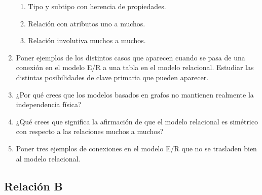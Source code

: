 \begin{enumerate}
\begin{enumerate}
        \item Tipo y subtipo con herencia de propiedades.
        \item Relación con atributos uno a muchos.
        \item Relación involutiva muchos a muchos.
    \end{enumerate}
    \item Poner ejemplos de los distintos casos que aparecen cuando se pasa de una conexión en el modelo E/R a una tabla en el modelo relacional. Estudiar las distintas posibilidades de clave primaria que pueden aparecer.
    \item ¿Por qué crees que los modelos basados en grafos no mantienen realmente la independencia física?
    \item ¿Qué crees que significa la afirmación de que el modelo relacional es simétrico con respecto a las relaciones muchos a muchos?
    \item Poner tres ejemplos de conexiones en el modelo E/R que no se trasladen bien al modelo relacional.
\end{enumerate}

\subsection{Relación B}

